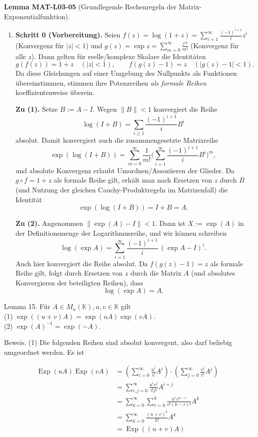 \documentclass[10pt, letterpaper]{article}
\newcommand{\CustomHeading}[3]{%
  \par\medskip\noindent%
  \textbf{#1 #2} \textnormal{(#3)}.\enskip%
}
\newenvironment{LEM}[2]{\begin{unitbox}\CustomHeading{Lemma}{#1}{#2}}{\end{unitbox}}
\begin{document}
\begin{LEM}{MAT-L03-05}{Grundlegende Rechenregeln der Matrix-Exponentialfunktion}
\begin{enumerate}
\item \textbf{Schritt 0 (Vorbereitung).}  
Seien $f(z)=\log(1+z)=\sum_{i=1}^{\infty}\frac{(-1)^{i+1}}{i}z^i$ (Konvergenz für $|z|<1$)
und $g(z)=\exp z=\sum_{m=0}^{\infty}\frac{z^m}{m!}$ (Konvergenz für alle $z$).  
Dann gelten für reelle/komplexe Skalare die Identitäten
\[
g(f(z))=1+z \quad (|z|<1),
\qquad
f(g(z)-1)=z \quad (|g(z)-1|<1).
\]
Da diese Gleichungen auf einer Umgebung des Nullpunkts als Funktionen übereinstimmen,
stimmen ihre Potenzreihen \emph{als formale Reihen} koeffizientenweise überein.

\smallskip
\textbf{Zu (1).}  
Setze $B:=A-I$. Wegen $\|B\|<1$ konvergiert die Reihe
$$\log(I+B)=\sum_{i\ge1}\frac{(-1)^{i+1}}{i}B^i$$ absolut.  
Damit konvergiert auch die zusammengesetzte Matrixreihe
\[
\exp(\log(I+B))=\sum_{m=0}^{\infty}\frac{1}{m!}\Big(\sum_{i=1}^{\infty}\frac{(-1)^{i+1}}{i}B^i\Big)^{\! m},
\]
und absolute Konvergenz erlaubt Umordnen/Assoziieren der Glieder.  
Da $g\circ f=1+z$ als formale Reihe gilt, erhält man nach Ersetzen von $z$ durch $B$
(und Nutzung der gleichen Cauchy-Produktregeln im Matrizenfall) die Identität
\[
\exp(\log(I+B))=I+B=A.
\]

\smallskip
\textbf{Zu (2).}  
Angenommen $\|\exp(A)-I\|<1$. Dann ist $X:=\exp(A)$ in der Definitionsmenge der Logarithmusreihe,
und wir können schreiben
\[
\log(\exp A)=\sum_{i=1}^{\infty}\frac{(-1)^{i+1}}{i}\,(\exp A - I)^i.
\]
Auch hier konvergiert die Reihe absolut.  
Da $f(g(z)-1)=z$ als formale Reihe gilt, folgt durch Ersetzen von $z$ durch die Matrix $A$ (und
absolutes Konvergieren der beteiligten Reihen), dass
\[
\log(\exp A)=A.
\]
\end{enumerate}

\end{LEM}




Lemma 15. Für $A \in M_{n}(\mathbb{K}), u, v \in \mathbb{K}$ gilt\\
(1) $\exp ((u+v) A)=\exp (u A) \exp (v A)$.\\
(2) $\exp (A)^{-1}=\exp (-A)$.

Beweis. (1) Die folgenden Reihen sind absolut konvergent, also darf beliebig umgeordnet werden. Es ist

$$
\begin{aligned}
\operatorname{Exp}(u A) \operatorname{Exp}(v A) & =\left(\sum_{i=0}^{\infty} \frac{u^{i}}{i!} A^{i}\right) \cdot\left(\sum_{j=0}^{\infty} \frac{v^{j}}{i!} A^{j}\right) \\
& =\sum_{i, j=0}^{\infty} \frac{u^{i} v^{j}}{i!j!} A^{i+j} \\
& =\sum_{k=0}^{\infty} \sum_{r=0}^{k} \frac{u^{r} v^{k-r}}{r!(k-r)!} A^{k} \\
& =\sum_{k=0}^{\infty} \frac{(u+v)^{k}}{k!} A^{k} \\
& =\operatorname{Exp}((u+v) A)
\end{aligned}
$$
\end{document}
